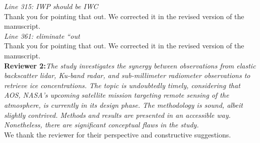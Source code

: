 \documentclass[12pt]{article}
\begin{document}
\newline
\textit{Line 315: IWP should be IWC}\\
\newline
Thank you for pointing that out. We corrected it in the revised version of the manuscript.\\
\newline
\textit{Line 361: eliminate “out}\\
\newline
Thank you for pointing that out. We corrected it in the revised version of the manuscript.\\
\newline
\pagebreak
\noindent \textbf{Reviewer 2:}\textit{The study investigates the synergy between observations from elastic backscatter lidar, Ku-band radar,
and sub-millimeter radiometer observations to retrieve ice concentrations. The topic is undoubtedly timely,
considering that AOS, NASA's upcoming satellite mission targeting remote sensing of the atmosphere,
is currently in its design phase. The methodology is sound, albeit slightly contrived. Methods and
results are presented in an accessible way.
Nonetheless, there are significant conceptual flaws in the study.}\\
\newline
We thank the reviewer for their perspective and constructive suggestions.\\
\end{document}

